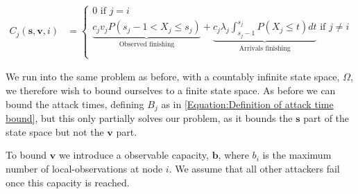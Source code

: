 \documentclass[a4paper,10pt]{article}
\theoremstyle{definition}
\theoremstyle{definition}
\theoremstyle{remark}
\theoremstyle{definition}
\begin{document}
\begin{align*}
C_{j}(\bm{s},\bm{v},i) &= \begin{cases}
0  \text{ if } j=i \\
\underbrace{c_{j} v_{j} P(s_{j}-1 < X_{j} \leq s_{j})}_{\text{Observed finishing}} + \underbrace{c_{j} \lambda_{j} \int_{s_{j}-1}^{s_{j}} P(X_{j} \leq t) dt}_{\text{Arrivals finishing}} \text{ if } j \neq i \\
\end{cases}
\end{align*}

We run into the same problem as before, with a countably infinite state space, $\Omega$, we therefore wish to bound ourselves to a finite state space. As before we can bound the attack times, defining $B_{j}$ as in \ref{Equation:Definition of attack time bound}, but this only partially solves our problem, as it bounds the $\bm{s}$ part of the state space but not the $\bm{v}$ part.

To bound $\bm{v}$ we introduce a observable capacity, $\bm{b}$, where $b_{i}$ is the maximum number of local-observations at node $i$. We assume that all other attackers fail once this capacity is reached.
\end{document}
